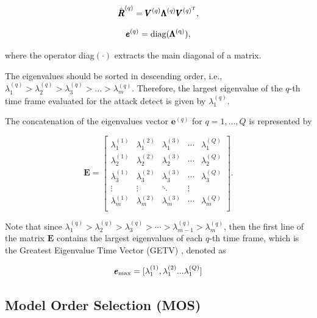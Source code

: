 \begin{equation}\label{eq:2.06}
\hat{\pmb{R}}^{(q)} = \pmb{V}^{(q)}\pmb{\Lambda}^{(q)}\pmb{V}^{(q)^{\rm T}},
\end{equation}

\begin{equation}\label{eq:2.060}
\pmb{e}^{(q)} = \rm diag(\pmb{\Lambda}^{(q)}),
\end{equation}

where the operator diag$(\cdot)$ extracts the main diagonal of a matrix.

The eigenvalues should be sorted in descending order, i.e., $\lambda_{1}^{(q)} > \lambda_{2}^{(q)} > \lambda_{3}^{(q)} > ... > \lambda_{m}^{(q)}$. Therefore, the largest eigenvalue of the $q$-th time frame evaluated for the attack detect is given by $\lambda_{1}^{(q)}$.

The concatenation of the eigenvalues vector $\pmb{e}^{(q)}$ for $q = 1, \ldots, Q$ is represented by

\begin{equation}\label{eq:2.07}
\pmb{E} =
\begin{bmatrix}
  \lambda_1^{(1)} & \lambda_1^{(2)} & \lambda_1^{(3)} & \cdots & \lambda_1^{(Q)} \\
  \lambda_2^{(1)} & \lambda_2^{(2)} & \lambda_2^{(3)} & \cdots & \lambda_2^{(Q)} \\
  \lambda_3^{(1)} & \lambda_3^{(2)} & \lambda_3^{(3)} & \cdots & \lambda_3^{(Q)} \\
  \vdots & \vdots & \ddots & \vdots  \\
  \lambda_m^{(1)} & \lambda_m^{(2)} & \lambda_m^{(3)} & \cdots & \lambda_m^{(Q)} \\
\end{bmatrix}.
\end{equation}

Note that since $\lambda_1^{(q)} > \lambda_2^{(q)} > \lambda_3^{(q)} > \cdots > \lambda_{m-1}^{(q)} > \lambda_m^{(q)}$, then the first line of the matrix $\pmb{E}$ contains the largest eigenvalues of each $q$-th time frame, which is the Greatest Eigenvalue Time
Vector (GETV) \cite{tenorio2013greatest}, denoted as 

\begin{equation}\label{eq:2.08}
\pmb{e}_{\rm max} = [ \lambda_1^{(1)}, \lambda_1^{(2)} ... \lambda_1^{(Q)}]
\end{equation}


\subsection{Model Order Selection (MOS)}
\label{sec:2_mos}

